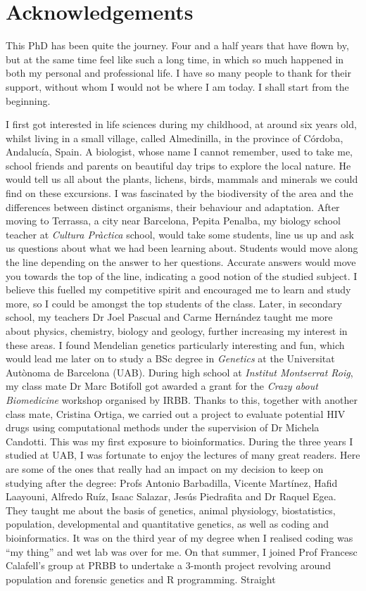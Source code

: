 \chapter*{Acknowledgements} %

This PhD has been quite the journey. Four and a half years that have flown by, but at the same time feel like such a long time, in which so much happened in both my personal and professional life. I have so many people to thank for their support, without whom I would not be where I am today. I shall start from the beginning.

I first got interested in life sciences during my childhood, at around six years old, whilst living in a small village, called Almedinilla, in the province of Córdoba, Andalucía, Spain. A biologist, whose name I cannot remember, used to take me, school friends and parents on beautiful day trips to explore the local nature. He would tell us all about the plants, lichens, birds, mammals and minerals we could find on these excursions. I was fascinated by the biodiversity of the area and the differences between distinct organisms, their behaviour and adaptation. After moving to Terrassa, a city near Barcelona, Pepita Penalba, my biology school teacher at \textit{Cultura Pràctica} school, would take some students, line us up and ask us questions about what we had been learning about. Students would move along the line depending on the answer to her questions. Accurate answers would move you towards the top of the line, indicating a good notion of the studied subject. I believe this fuelled my competitive spirit and encouraged me to learn and study more, so I could be amongst the top students of the class. Later, in secondary school, my teachers Dr Joel Pascual and Carme Hernández taught me more about physics, chemistry, biology and geology, further increasing my interest in these areas. I found Mendelian genetics particularly interesting and fun, which would lead me later on to study a BSc degree in \textit{Genetics} at the Universitat Autònoma de Barcelona (UAB). During high school at \textit{Institut Montserrat Roig}, my class mate Dr Marc Botifoll got awarded a grant for the \textit{Crazy about Biomedicine} workshop organised by IRBB. Thanks to this, together with another class mate, Cristina Ortiga, we carried out a project to evaluate potential HIV drugs using computational methods under the supervision of Dr Michela Candotti. This was my first exposure to bioinformatics. During the three years I studied at UAB, I was fortunate to enjoy the lectures of many great readers. Here are some of the ones that really had an impact on my decision to keep on studying after the degree: Profs Antonio Barbadilla, Vicente Martínez, Hafid Laayouni, Alfredo Ruíz, Isaac Salazar, Jesús Piedrafita and Dr Raquel Egea. They taught me about the basis of genetics, animal physiology, biostatistics, population, developmental and quantitative genetics, as well as coding and bioinformatics. It was on the third year of my degree when I realised coding was ``my thing'' and wet lab was over for me. On that summer, I joined Prof Francesc Calafell's group at PRBB to undertake a 3-month project revolving around population and forensic genetics and R programming. Straight 